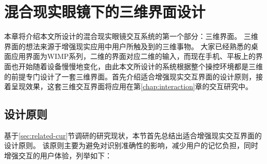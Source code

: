
\chapter{混合现实眼镜下的三维界面设计}
\label{chap:3DUI}

本章将介绍本文所设计的混合现实眼镜交互系统的第一个部分：三维界面。
三维界面的想法来源于增强现实应用中用户所触及到的三维事物。
大家已经熟悉的桌面应用界面为WIMP系列，二维的界面对应二维的输入，而现在手机、平板上的界面也开始随着设备慢慢地变化，由此本文所设计的系统根据整个操控环境都是三维的前提专门设计了一套三维界面。首先介绍适合增强现实交互界面的设计原则，接着呈现效果，这套三维交互界面将应用在第\ref{chap:interaction}章的交互研究中。

\section{设计原则}

基于\ref{sec:related-cur}节调研的研究现状，本节首先总结出适合增强现实交互界面的设计原则。
该原则主要为避免对识别准确性的影响，减少用户的记忆负担，同时增强交互的用户体验，列举如下：

